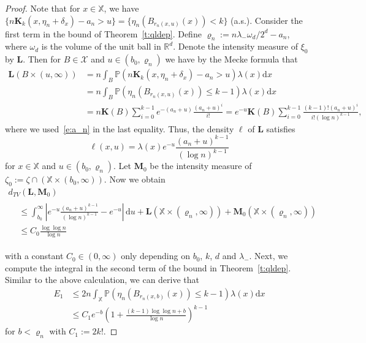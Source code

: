 \documentclass[10pt]{amsart}
\theoremstyle{definition}\newtheorem{defi}[theo]{Definition}\newtheorem{rema}[theo]{Remark}\newtheorem{exam}[theo]{Example}\newtheorem{exem}[theo]{Example}\newtheorem{nota}[theo]{Notation}
\newcommand*\bL{\mathbf{L}}
\newcommand*\bM{\mathbf{M}}
\newcommand*\bK{\mathbf{K}}
\newcommand*\R{\mathbb{R}}
\renewcommand*\P{\mathbb{P}}
\newcommand*\X{\mathbb{X}}
\newcommand*\cX{\mathcal{X}}
\newcommand*\md{\mathrm{d}}
\newcommand{\param}[1]{\left(#1\right)}
\newcommand{\prob}[1]{\P\left(#1\right)}
\begin{document}
\begin{proof}
Note that for $x\in\X$, we have $\{n\bK_k(x,\eta_n+\delta_x) - a_n >u \} = \{ \eta_n(B_{r_n(x,u)}(x)) < k \}$ ({a.s.}). Consider the first term in the bound of Theorem~\ref{t:qldep}. Define $\varrho_n:=n\lambda_- \omega_d/2^d - a_n$, where $\omega_d$ is the volume of the unit ball in $\R^d$. Denote the intensity measure of $\xi_0$ by $\bL$. Then for $B \in \cX$ and $u \in (b_0,\varrho_n)$ we have by the Mecke formula that
\begin{align*}
\bL\left(B \times (u,\infty)\right) &= n \int_{B} \prob{n\bK_k\left(x,\eta_n + \delta_x\right) - a_n > u} \lambda(x) \md x \\
& = n \int_{B} \prob{\eta_n\left(B_{r_n(x,u)}(x)\right) \leq k-1} \lambda(x) \md x \\
& = n \bK(B) \sum_{i=0}^{k-1}e^{-(a_n+u)}\frac{(a_n+u)^i}{i!} = e^{-u} \bK(B) \sum_{i=0}^{k-1} \frac{(k-1)!(a_n+u)^i}{ i! (\log n)^{k-1}},
\end{align*}
where we used~\eqref{e:a_n} in the last equality. Thus, the density $\ell$ of $\bL$ satisfies
\[
\ell(x,u) = \lambda(x) e^{-u} \frac{(a_n+u)^{k-1}}{(\log n)^{k-1}}
\]
for $x\in\X$ and $u\in(b_0,\varrho_n)$. Let $\bM_0$ be the intensity measure of $\zeta_0 := \zeta \cap (\X \times (b_0,\infty))$. Now we obtain
\begin{multline}\label{e:knngt1}
d_{TV}\left(\bL,\bM_0\right)\\
\begin{aligned}
&\leq \int_{{b_0}}^{\infty} \left| e^{-u} \frac{(a_n+u)^{k-1}}{(\log n)^{k-1}} -e^{-u} \right| \, \md u + \bL\left(\X\times \left(\varrho_n,\infty\right)\right) +\bM_0\left(\X\times \left(\varrho_n,\infty\right)\right) \\
&\leq C_0\frac{\log \log n}{\log n}
\end{aligned}
\end{multline}

\noindent with a constant $C_0\in(0,\infty)$ only depending on $b_0$, $k$, $d$ and $\lambda_-$. Next, we compute the integral in the second term of the bound in Theorem~\ref{t:qldep}. Similar to the above calculation, we can derive that
\begin{equation}\label{e:knngt2}
\begin{split}
E_1 & \leq {2} n \int_{\X} \prob{\eta_n\left(B_{r_n(x,b)}(x)\right) \leq k-1} \lambda(x) \md x \\
&\leq C_1 e^{-b}\param{1 + \frac{(k-1) \log \log n +b}{\log n}}^{k-1}
\end{split}
\end{equation}
for $b<\varrho_n$ with $C_1:=2 k!$.


\end{proof}
\end{document}
